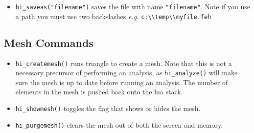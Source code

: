 \begin{itemize}
\item {\tt hi\_saveas("filename")} saves the file with name
\texttt{"filename"}. Note if you use a path you must use two backslashes
{\em e.g.} \verb+c:\\temp\\myfile.feh+

\end{itemize}

\subsection{Mesh Commands}

\begin{itemize}
\item \texttt{hi\_createmesh()} runs triangle to create a mesh. Note that this is not
a necessary precursor of performing an analysis, as
\texttt{hi\_analyze()} will make sure the mesh is up to date before
running an analysis. The number of elements in the mesh is pushed
back onto the lua stack.

\item \texttt{hi\_showmesh()} toggles the flag that shows or hides the mesh.

\item \texttt{hi\_purgemesh()} clears the mesh out of both the screen and memory.
\end{itemize}

